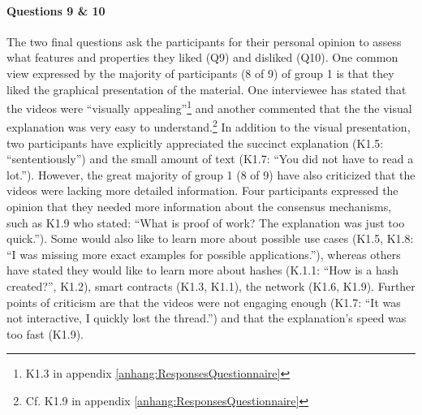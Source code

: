 \paragraph{Questions 9 \& 10}The two final questions ask the participants for their personal opinion to assess what features and properties they liked (Q9) and disliked (Q10). One common view expressed by the majority of participants (8 of 9) of group 1 is that they liked the graphical presentation of the material. One interviewee has stated that the videos were \enquote{visually appealing}\footnote{K1.3 in appendix \ref{anhang:ResponsesQuestionnaire}} and another commented that the the visual explanation was very easy to understand.\footnote{Cf. K1.9 in appendix \ref{anhang:ResponsesQuestionnaire}} In addition to the visual presentation, two participants have explicitly appreciated the succinct explanation (K1.5: \enquote{sententiously}) and the small amount of text (K1.7: \enquote{You did not have to read a lot.}). However, the great majority of group 1 (8 of 9) have also criticized that the videos were lacking more detailed information. Four participants expressed the opinion that they needed more information about the consensus mechanisms, such as K1.9 who stated: \enquote{What is proof of work? The explanation was just too quick.}). Some would also like to learn more about possible use cases (K1.5, K1.8: \enquote{I was missing more exact examples for possible applications.}), whereas others have stated they would like to learn more about hashes (K.1.1: \enquote{How is a hash created?}, K1.2), smart contracts (K1.3, K1.1), the network (K1.6, K1.9).
Further points of criticism are that the videos were not engaging enough (K1.7: \enquote{It was not interactive, I quickly lost the thread.}) and that the explanation's speed was too fast (K1.9).

